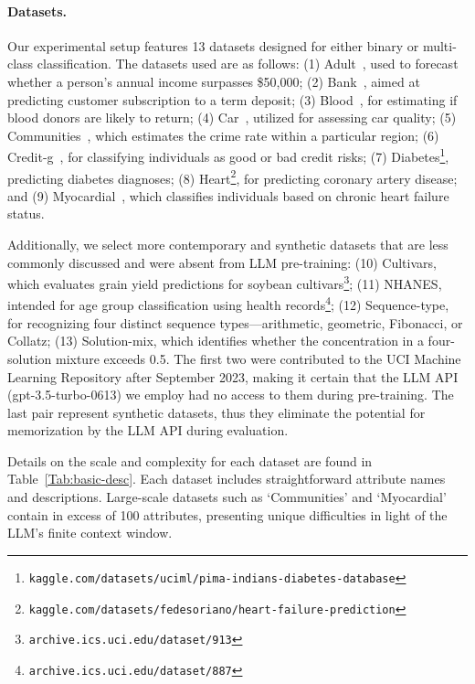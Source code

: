 \paragraph{Datasets.}
Our experimental setup features 13 datasets designed for either binary or multi-class classification. The datasets used are as follows: (1) Adult~\cite{asuncion2007uci}, used to forecast whether a person's annual income surpasses \$50,000; (2) Bank~\cite{moro2014data}, aimed at predicting customer subscription to a term deposit; (3) Blood~\cite{yeh2009knowledge}, for estimating if blood donors are likely to return; (4) Car~\cite{kadra2021well}, utilized for assessing car quality; (5) Communities~\cite{misc_communities_and_crime_183}, which estimates the crime rate within a particular region; (6) Credit-g~\cite{kadra2021well}, for classifying individuals as good or bad credit risks; (7) Diabetes\footnote{\texttt{kaggle.com/datasets/uciml/pima-indians-diabetes-database}}, predicting diabetes diagnoses; (8) Heart\footnote{\texttt{kaggle.com/datasets/fedesoriano/heart-failure-prediction}}, for predicting coronary artery disease; and (9) Myocardial~\cite{misc_myocardial_infarction_complications_579}, which classifies individuals based on chronic heart failure status.

Additionally, we select more contemporary and synthetic datasets that are less commonly discussed and were absent from LLM pre-training: (10) Cultivars, which evaluates grain yield predictions for soybean cultivars\footnote{\texttt{archive.ics.uci.edu/dataset/913}}; (11) NHANES, intended for age group classification using health records\footnote{\texttt{archive.ics.uci.edu/dataset/887}}; (12) Sequence-type, for recognizing four distinct sequence types—arithmetic, geometric, Fibonacci, or Collatz; (13) Solution-mix, which identifies whether the concentration in a four-solution mixture exceeds 0.5. The first two were contributed to the UCI Machine Learning Repository after September 2023, making it certain that the LLM API (gpt-3.5-turbo-0613) we employ had no access to them during pre-training. The last pair represent synthetic datasets, thus they eliminate the potential for memorization by the LLM API during evaluation.

Details on the scale and complexity for each dataset are found in Table~\ref{Tab:basic-desc}.
Each dataset includes straightforward attribute names and descriptions. Large-scale datasets such as `Communities' and `Myocardial' contain in excess of 100 attributes, presenting unique difficulties in light of the LLM's finite context window.

